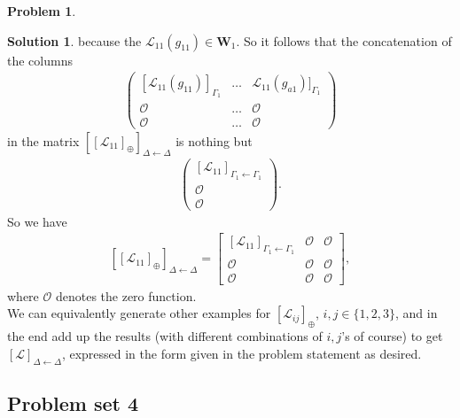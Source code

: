 \documentclass{article}
\theoremstyle{definition}
\newtheorem*{prob*}{Problem}
\newtheorem*{sln*}{Solution}
\newcommand{\W}{\mathbf{W}}
\newcommand{\lag}{\mathcal{L}}
\begin{document}
\begin{prob*}
\begin{sln*}
	because the $\lag_{11}(g_{11}) \in \W_1$. So it follows that the concatenation of the columns 
	\begin{align*}
	\begin{pmatrix}
	[\lag_{11}(g_{11})]_{\Gamma_1} &\dots & \lag_{11}(g_{a1})]_{\Gamma_1}
	\\ \mathcal{O} & \dots & \mathcal{O}
	\\ \mathcal{O} & \dots & \mathcal{O}
	\end{pmatrix}
	\end{align*}
	in the matrix $\left[[\lag_{11}]_\oplus\right]_{\Delta\leftarrow\Delta}$ is nothing but 
	\begin{align*}
	\begin{pmatrix}
	[\lag_{11}]_{\Gamma_1\leftarrow\Gamma_1} \\ \mathcal{O} \\ \mathcal{O}
	\end{pmatrix}.
	\end{align*}
	So we have
	\begin{align*}
	\left[[\lag_{11}]_\oplus\right]_{\Delta\leftarrow\Delta} = \begin{bmatrix}
	[\lag_{11}]_{\Gamma_1\leftarrow\Gamma_1} & \mathcal{O} & \mathcal{O}\\
	\mathcal{O} & \mathcal{O} & \mathcal{O}\\
	\mathcal{O} & \mathcal{O} & \mathcal{O}
	\end{bmatrix},
	\end{align*}
	where $\mathcal{O}$ denotes the zero function.\\
	
	We can equivalently generate other examples for $[\lag_{ij}]_\oplus$, $i,j\in \{1,2,3\}$, and in the end add up the results (with different combinations of $i,j$'s of course) to get $[\lag]_{\Delta\leftarrow\Delta}$, expressed in the form given in the problem statement as desired.  
	\end{sln*}
\end{prob*}







\newpage




\subsection{Problem set 4}
\end{document}
